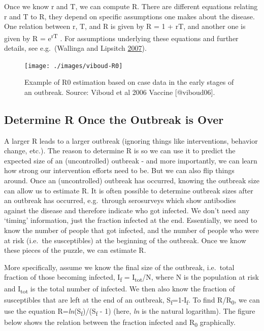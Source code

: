 \documentclass[
]{book}
\begin{document}
Once we know r and T, we can compute R. There are different equations relating r and T to R, they depend on specific assumptions one makes about the disease. One relation between r, T, and R is given by R = 1 + rT, and another one is given by R = e\textsuperscript{rT} . For assumptions underlying these equations and further details, see e.g.~(Wallinga and Lipsitch \protect\hyperlink{ref-wallinga07}{2007}).

\begin{figure}
\texttt{[image: ./images/viboud-R0]} \caption{Example of R0 estimation based on case data in the early stages of an outbreak. Source: Viboud et al 2006 Vaccine [@viboud06].}\label{fig:viboudR0}
\end{figure}

\hypertarget{determine-r-once-the-outbreak-is-over}{%
\subsection{Determine R Once the Outbreak is Over}\label{determine-r-once-the-outbreak-is-over}}

A larger R leads to a larger outbreak (ignoring things like interventions, behavior change, etc.). The reason to determine R is so we can use it to predict the expected size of an (uncontrolled) outbreak - and more importantly, we can learn how strong our intervention efforts need to be. But we can also flip things around. Once an (uncontrolled) outbreak has occurred, knowing the outbreak size can allow us to estimate R. It is often possible to determine outbreak sizes after an outbreak has occurred, e.g.~through serosurveys which show antibodies against the disease and therefore indicate who got infected. We don't need any `timing' information, just the fraction infected at the end. Essentially, we need to know the number of people that got infected, and the number of people who were at risk (i.e.~the susceptibles) at the beginning of the outbreak. Once we know these pieces of the puzzle, we can estimate R.

More specifically, assume we know the final size of the outbreak, i.e.~total fraction of those becoming infected, I\textsubscript{f} = I\textsubscript{tot}/N, where N is the population at risk and I\textsubscript{tot} is the total number of infected. We then also know the fraction of susceptibles that are left at the end of an outbreak, S\textsubscript{f}=1-I\textsubscript{f}. To find R/R\textsubscript{0}, we can use the equation R=\emph{ln}(S\textsubscript{f})/(S\textsubscript{f} - 1) (here, \emph{ln} is the natural logarithm). The figure below shows the relation between the fraction infected and R\textsubscript{0} graphically.
\end{document}
